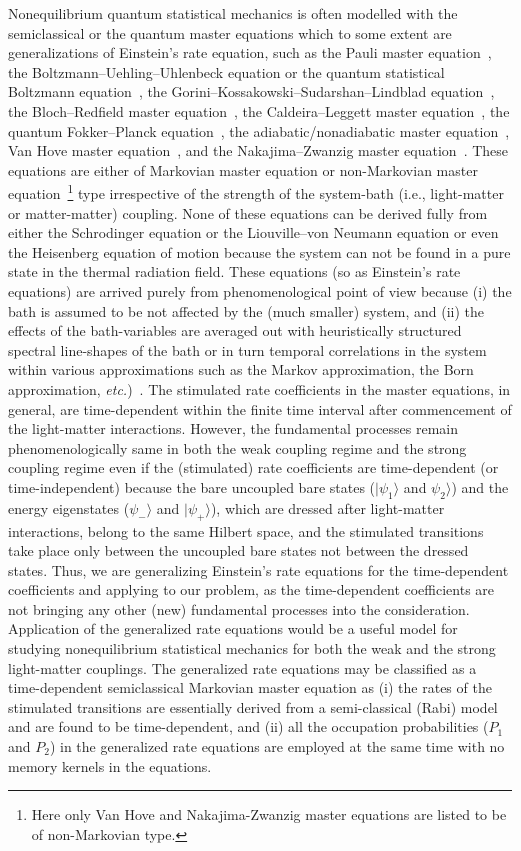 \documentclass[aps,pra,twocolumn,showpacs,preprintnumbers,amsmath,amssymb,footinbib]{revtex4}
\begin{document}
Nonequilibrium quantum statistical mechanics is often modelled with the semiclassical or the quantum master equations which to some extent are generalizations of Einstein's rate equation, such as the Pauli master equation~\cite{Pauli}, the Boltzmann--Uehling--Uhlenbeck equation or  the quantum statistical Boltzmann equation~\cite{Pauli,Das}, the Gorini--Kossakowski--Sudarshan--Lindblad equation~\cite{Lindblad}, the Bloch--Redfield master equation~\cite{Wollfarth,Leggett}, the Caldeira--Leggett master equation~\cite{Caldeira,Leggett}, the quantum Fokker--Planck equation~\cite{Chang}, the adiabatic/nonadiabatic master equation~\cite{Dann}, Van Hove master equation~\cite{VanHove}, and the Nakajima--Zwanzig master equation~\cite{Nakajima}. These equations are either of Markovian master equation or non-Markovian master equation~\footnote{Here only Van Hove and Nakajima-Zwanzig master equations are listed to be of non-Markovian type.} type irrespective of the strength of the system-bath (i.e., light-matter or matter-matter) coupling. None of these equations can be derived fully from either the Schrodinger equation or the Liouville--von Neumann equation or even the Heisenberg equation of motion because the system can not be found in a pure state in the thermal radiation field. These equations (so as Einstein's rate equations) are arrived purely from phenomenological point of view  because (i) the bath is assumed to be not affected by the (much smaller) system, and (ii) the effects of the bath-variables are averaged out with heuristically structured spectral line-shapes of the bath or in turn temporal correlations in the system within various approximations such as the Markov approximation, the Born approximation, \textit{etc.})~\cite{Agarwal2}. The stimulated rate coefficients in the master equations, in general, are time-dependent within the finite time interval after commencement of the light-matter interactions. However, the fundamental processes remain phenomenologically same in both the weak coupling regime and the strong coupling regime even if the (stimulated) rate coefficients are time-dependent (or time-independent) because the bare uncoupled bare states ($|\psi_1\rangle$ and $\psi_2\rangle$) and the energy eigenstates ($\psi_-\rangle$ and $|\psi_+\rangle$), which are dressed after light-matter interactions, belong to the same Hilbert space, and the stimulated transitions take place only between the uncoupled bare states not between the dressed states. Thus, we are generalizing Einstein's rate equations for the time-dependent coefficients and applying to our problem, as the time-dependent coefficients are not bringing any other (new) fundamental processes into the consideration. Application of the generalized rate equations would be a useful model for studying nonequilibrium statistical mechanics for both the weak and the strong light-matter couplings. The generalized rate equations may be classified as a time-dependent semiclassical Markovian master equation as (i) the rates of the stimulated transitions are essentially derived from a semi-classical (Rabi) model and are found to be time-dependent, and (ii) all the occupation probabilities ($P_1$ and $P_2$) in the generalized rate equations are employed at the same time with no memory kernels in the equations. 
\end{document}
